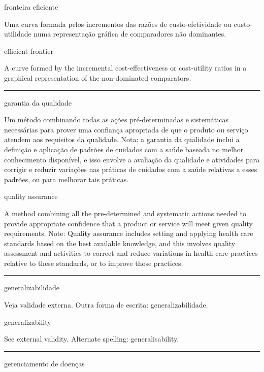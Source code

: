 \documentclass[
]{book}
\begin{document}
fronteira eficiente

Uma curva formada pelos incrementos das razões de custo-efetividade ou custo-utilidade numa representação gráfica de comparadores não dominantes.

efficient frontier

A curve formed by the incremental cost-effectiveness or cost-utility ratios in a graphical representation of the non-dominated comparators.

\begin{center}\rule{0.5\linewidth}{0.5pt}\end{center}

garantia da qualidade

Um método combinando todas as ações pré-determinadas e sistemáticas necessárias para prover uma confiança apropriada de que o produto ou serviço atendem aos requisitos da qualidade. Nota: a garantia da qualidade inclui a definição e aplicação de padrões de cuidados com a saúde baseada no melhor conhecimento disponível, e isso envolve a avaliação da qualidade e atividades para corrigir e reduzir variações nas práticas de cuidados com a saúde relativas a esses padrões, ou para melhorar tais práticas.

quality assurance

A method combining all the pre-determined and systematic actions needed to provide appropriate confidence that a product or service will meet given quality requirements. Note: Quality assurance includes setting and applying health care standards based on the best available knowledge, and this involves quality assessment and activities to correct and reduce variations in health care practices relative to these standards, or to improve those practices.

\begin{center}\rule{0.5\linewidth}{0.5pt}\end{center}

generalizabilidade

Veja validade externa. Outra forma de escrita: generalizabilidade.

generalizability

See external validity. Alternate spelling: generalisability.

\begin{center}\rule{0.5\linewidth}{0.5pt}\end{center}

gerenciamento de doenças
\end{document}
